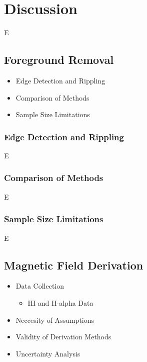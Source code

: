 \chapter{Discussion}
\label{cha:discussion}

E

\section{Foreground Removal}
\label{sec:fr_disc}

\begin{itemize}
    \item Edge Detection and Rippling
    \item Comparison of Methods
    \item Sample Size Limitations
\end{itemize}

\subsection{Edge Detection and Rippling}
\label{ssec:A1}

E

\subsection{Comparison of Methods}
\label{ssec:A2}

E

\subsection{Sample Size Limitations}
\label{ssec:A3}

E

\section{Magnetic Field Derivation}
\label{sec:mag_disc}

\begin{itemize}
    \item Data Collection
    \begin{itemize}
        \item HI and H-alpha Data
    \end{itemize}
    \item Neccesity of Assumptions
    \item Validity of Derivation Methods
    \item Uncertainty Analysis
\end{itemize}

